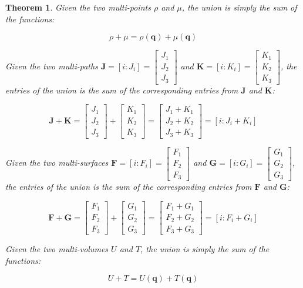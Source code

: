 \documentclass{book}
\newtheorem{thm}{Theorem}
\begin{document}
\begin{thm}
Given the two multi-points \(\rho\) and \(\mu\), the union is simply the sum of the functions:

\[\rho + \mu = \rho(\mathbf{q}) + \mu(\mathbf{q})\]


Given the two multi-paths \(\mathbf{J} = [i : J_i] = \begin{bmatrix} J_1 \\ J_2 \\ J_3 \end{bmatrix}\) and \(\mathbf{K} = [i : K_i] = \begin{bmatrix} K_1 \\ K_2 \\ K_3 \end{bmatrix}\), the entries of the union is the sum of the corresponding entries from \(\mathbf{J}\) and \(\mathbf{K}\):

\[\mathbf{J} + \mathbf{K} = \begin{bmatrix} J_1 \\ J_2 \\ J_3 \end{bmatrix} + \begin{bmatrix} K_1 \\ K_2 \\ K_3 \end{bmatrix} = \begin{bmatrix} J_1 + K_1 \\ J_2 + K_2 \\ J_3 + K_3 \end{bmatrix} = [i : J_i + K_i]\]


Given the two multi-surfaces \(\mathbf{F} = [i : F_i] = \begin{bmatrix} F_1 \\ F_2 \\ F_3 \end{bmatrix}\) and \(\mathbf{G} = [i : G_i] = \begin{bmatrix} G_1 \\ G_2 \\ G_3 \end{bmatrix}\), the entries of the union is the sum of the corresponding entries from \(\mathbf{F}\) and \(\mathbf{G}\):

\[\mathbf{F} + \mathbf{G} = \begin{bmatrix} F_1 \\ F_2 \\ F_3 \end{bmatrix} + \begin{bmatrix} G_1 \\ G_2 \\ G_3 \end{bmatrix} = \begin{bmatrix} F_1 + G_1 \\ F_2 + G_2 \\ F_3 + G_3 \end{bmatrix} = [i : F_i + G_i]\]


Given the two multi-volumes \(U\) and \(T\), the union is simply the sum of the functions:

\[U + T = U(\mathbf{q}) + T(\mathbf{q})\]
\end{thm}
\end{document}
